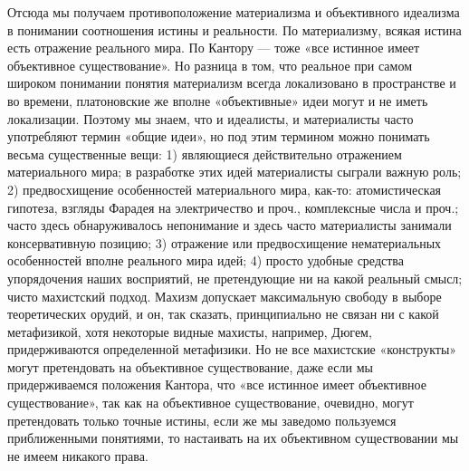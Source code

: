 Отсюда  мы  получаем   противоположение  материализма  и  объективного
идеализма   в   понимании   соотношения  истины   и   реальности.   По
материализму, всякая истина есть  отражение реального мира. По Кантору
--- тоже «все истинное имеет  объективное существование». Но разница в
том,  что реальное  при  самом широком  понимании понятия  материализм
всегда  локализовано  в пространстве  и  во  времени, платоновские  же
вполне «объективные»  идеи могут  и не  иметь локализации.  Поэтому мы
знаем, что и идеалисты, и материалисты часто употребляют термин «общие
идеи»,  но  под  этим  термином  можно  понимать  весьма  существенные
вещи:  1)  являющиеся  действительно  отражением  материального  мира;
в  разработке   этих  идей   материалисты  сыграли  важную   роль;  2)
предвосхищение особенностей материального мира, как-то: атомистическая
гипотеза,  взгляды  Фарадея  на  электричество  и  проч.,  комплексные
числа  и  проч.;  часто   здесь  обнаруживалось  непонимание  и  здесь
часто  материалисты  занимали  консервативную  позицию;  3)  отражение
или предвосхищение  нематериальных особенностей вполне  реального мира
идей;  4) просто  удобные средства  упорядочения наших  восприятий, не
претендующие  ни на  какой  реальный смысл;  чисто махистский  подход.
Махизм допускает максимальную свободу в выборе теоретических орудий, и
он, так сказать, принципиально не  связан ни с какой метафизикой, хотя
некоторые видные махисты, например, Дюгем, придерживаются определенной
метафизики. Но  не все  махистские «конструкты» могут  претендовать на
объективное  существование,  даже  если  мы  придерживаемся  положения
Кантора, что  «все истинное имеет объективное  существование», так как
на  объективное  существование,  очевидно, могут  претендовать  только
точные истины, если же мы заведомо пользуемся приближенными понятиями,
то настаивать  на их  объективном существовании  мы не  имеем никакого
права.

